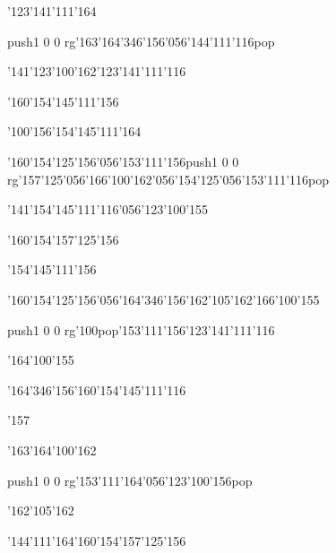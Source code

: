 \null\vfill\ipa\centerline{\enskip\enskip\enskip\enskip\enskip\enskip\enskip\enskip\char'123\char'141\char'111\char'164}\medskip\centerline{\enskip\pdfcolorstack\match push{1 0 0 rg}\char'163\char'164\char'346\char'156\char'056\char'144\char'111\char'116\pdfcolorstack\match pop{}\enskip\enskip\enskip\enskip\enskip\enskip\enskip\enskip\enskip\enskip\enskip}\medskip\centerline{\enskip\char'141\enskip\enskip\enskip\enskip\char'123\char'100\char'162\enskip\char'123\char'141\char'111\char'116\enskip\enskip\enskip\enskip}\medskip\centerline{\enskip\enskip\enskip\enskip\enskip\enskip\enskip\enskip\enskip\enskip\enskip\enskip\enskip\enskip}\medskip\centerline{\enskip\enskip\enskip\enskip\enskip\enskip\enskip\enskip\enskip\char'160\char'154\char'145\char'111\char'156}\medskip\vfill\footline{\hfil\tt\folio\hfil}\eject
\null\vfill\ipa\centerline{\enskip\enskip\enskip\enskip\char'100\char'156\enskip\enskip\char'154\char'145\char'111\char'164}\medskip\centerline{\enskip\char'160\char'154\char'125\char'156\char'056\char'153\char'111\char'156\enskip\pdfcolorstack\match push{1 0 0 rg}\char'157\char'125\char'056\char'166\char'100\char'162\char'056\char'154\char'125\char'056\char'153\char'111\char'116\pdfcolorstack\match pop{}}\medskip\centerline{\enskip\char'141\enskip\enskip\enskip\enskip\enskip\enskip\enskip\enskip\char'154\char'145\char'111\char'116\char'056\char'123\char'100\char'155}\medskip\centerline{\enskip\enskip\enskip\enskip\enskip\enskip\enskip\enskip\enskip\enskip\enskip\enskip\enskip\enskip}\medskip\centerline{\enskip\enskip\enskip\enskip\enskip\enskip\enskip\enskip\enskip\char'160\char'154\char'157\char'125\char'156}\medskip\vfill\footline{\hfil\tt\folio\hfil}\eject
\null\vfill\ipa\centerline{\enskip\enskip\enskip\enskip\enskip\enskip\enskip\enskip\char'154\char'145\char'111\char'156}\medskip\centerline{\enskip\char'160\char'154\char'125\char'156\char'056\char'164\char'346\char'156\enskip\enskip\enskip\char'162\char'105\char'162\enskip\enskip\enskip\char'166\char'100\char'155}\medskip\centerline{\enskip\pdfcolorstack\match push{1 0 0 rg}\char'100\pdfcolorstack\match pop{}\enskip\char'153\char'111\char'156\enskip\enskip\enskip\enskip\enskip\char'123\char'141\char'111\char'116\enskip\enskip\enskip\enskip}\medskip\centerline{\enskip\enskip\enskip\enskip\enskip\char'164\char'100\char'155\enskip\enskip\enskip\enskip\enskip\enskip}\medskip\centerline{\enskip\enskip\enskip\char'164\char'346\char'156\enskip\enskip\enskip\enskip\char'160\char'154\char'145\char'111\char'116}\medskip\vfill\footline{\hfil\tt\folio\hfil}\eject
\null\vfill\ipa\centerline{\enskip\enskip\enskip\enskip\enskip\enskip\enskip\char'157\enskip\enskip\enskip\enskip\enskip}\medskip\centerline{\enskip\char'163\char'164\char'100\char'162\enskip\enskip\enskip\enskip\enskip\enskip\enskip\enskip\enskip\enskip\enskip\enskip\enskip\enskip\enskip}\medskip\centerline{\enskip\enskip\enskip\pdfcolorstack\match push{1 0 0 rg}\char'153\char'111\char'164\char'056\char'123\char'100\char'156\pdfcolorstack\match pop{}\enskip\enskip\enskip\enskip\enskip\enskip\enskip\enskip}\medskip\centerline{\enskip\enskip\enskip\enskip\enskip\char'162\char'105\char'162\enskip\enskip\enskip\enskip\enskip\enskip}\medskip\centerline{\enskip\enskip\enskip\char'144\char'111\char'164\enskip\enskip\enskip\enskip\char'160\char'154\char'157\char'125\char'156}\medskip\vfill\footline{\hfil\tt\folio\hfil}\eject
